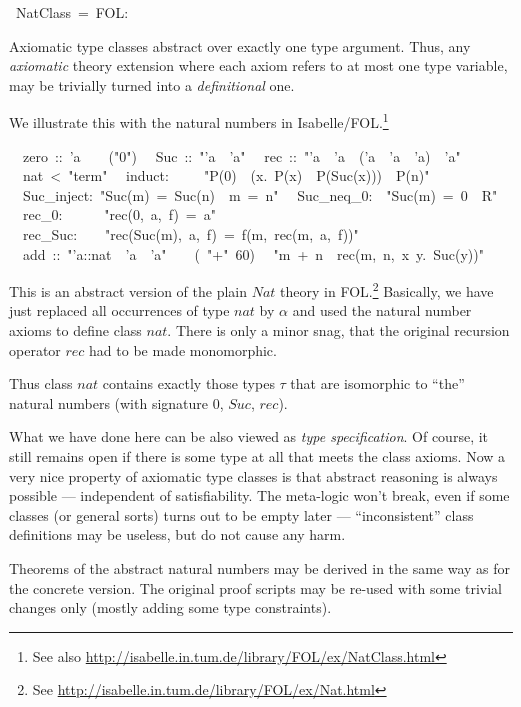 \begin{isabelle}%
%
~NatClass~=~FOL:%
\begin{isamarkuptext}%
\medskip\noindent Axiomatic type classes abstract over exactly one
 type argument. Thus, any \emph{axiomatic} theory extension where each
 axiom refers to at most one type variable, may be trivially turned
 into a \emph{definitional} one.

 We illustrate this with the natural numbers in
 Isabelle/FOL.\footnote{See also
 \url{http://isabelle.in.tum.de/library/FOL/ex/NatClass.html}}%
\end{isamarkuptext}%
\isanewline
~~zero~::~'a~~~~({"}0{"})\isanewline
~~Suc~::~{"}'a~{\isasymRightarrow}~'a{"}\isanewline
~~rec~::~{"}'a~{\isasymRightarrow}~'a~{\isasymRightarrow}~('a~{\isasymRightarrow}~'a~{\isasymRightarrow}~'a)~{\isasymRightarrow}~'a{"}\isanewline
\isanewline
{}\isanewline
~~nat~<~{"}term{"}\isanewline
~~induct:~~~~~{"}P(0)~{\isasymLongrightarrow}~({\isasymAnd}x.~P(x)~{\isasymLongrightarrow}~P(Suc(x)))~{\isasymLongrightarrow}~P(n){"}\isanewline
~~Suc\_inject:~{"}Suc(m)~=~Suc(n)~{\isasymLongrightarrow}~m~=~n{"}\isanewline
~~Suc\_neq\_0:~~{"}Suc(m)~=~0~{\isasymLongrightarrow}~R{"}\isanewline
~~rec\_0:~~~~~~{"}rec(0,~a,~f)~=~a{"}\isanewline
~~rec\_Suc:~~~~{"}rec(Suc(m),~a,~f)~=~f(m,~rec(m,~a,~f)){"}\isanewline
\isanewline
{}\isanewline
~~add~::~{"}'a::nat~{\isasymRightarrow}~'a~{\isasymRightarrow}~'a{"}~~~~(~{"}+{"}~60)\isanewline
~~{"}m~+~n~{\isasymequiv}~rec(m,~n,~{\isasymlambda}x~y.~Suc(y)){"}%
\begin{isamarkuptext}%
This is an abstract version of the plain $Nat$ theory in
 FOL.\footnote{See
 \url{http://isabelle.in.tum.de/library/FOL/ex/Nat.html}} Basically,
 we have just replaced all occurrences of type $nat$ by $\alpha$ and
 used the natural number axioms to define class $nat$.  There is only
 a minor snag, that the original recursion operator $rec$ had to be
 made monomorphic.

 Thus class $nat$ contains exactly those types $\tau$ that are
 isomorphic to ``the'' natural numbers (with signature $0$, $Suc$,
 $rec$).

 \medskip What we have done here can be also viewed as \emph{type
 specification}.  Of course, it still remains open if there is some
 type at all that meets the class axioms.  Now a very nice property of
 axiomatic type classes is that abstract reasoning is always possible
 --- independent of satisfiability.  The meta-logic won't break, even
 if some classes (or general sorts) turns out to be empty later ---
 ``inconsistent'' class definitions may be useless, but do not cause
 any harm.

 Theorems of the abstract natural numbers may be derived in the same
 way as for the concrete version.  The original proof scripts may be
 re-used with some trivial changes only (mostly adding some type
 constraints).%
\end{isamarkuptext}%
\end{isabelle}%
